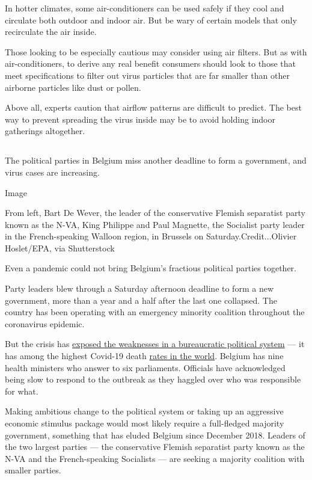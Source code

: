 In hotter climates, some air-conditioners can be used safely if they
cool and circulate both outdoor and indoor air. But be wary of certain
models that only recirculate the air inside.

Those looking to be especially cautious may consider using air filters.
But as with air-conditioners, to derive any real benefit consumers
should look to those that meet specifications to filter out virus
particles that are far smaller than other airborne particles like dust
or pollen.

Above all, experts caution that airflow patterns are difficult to
predict. The best way to prevent spreading the virus inside may be to
avoid holding indoor gatherings altogether.

\hypertarget{section-10}{%
\subsection{}\label{section-10}}

The political parties in Belgium miss another deadline to form a
government, and virus cases are increasing.

Image

From left, Bart De Wever, the leader of the conservative Flemish
separatist party known as the N-VA, King Philippe and Paul Magnette, the
Socialist party leader in the French-speaking Walloon region, in
Brussels on Saturday.Credit...Olivier Hoslet/EPA, via Shutterstock

Even a pandemic could not bring Belgium's fractious political parties
together.

Party leaders blew through a Saturday afternoon deadline to form a new
government, more than a year and a half after the last one collapsed.
The country has been operating with an emergency minority coalition
throughout the coronavirus epidemic.

But the crisis has
\href{https://www.nytimes.com/2020/08/08/world/europe/coronavirus-nursing-homes-elderly.html}{exposed
the weaknesses in a bureaucratic political system} --- it has among the
highest Covid-19 death
\href{https://www.nytimes.com/interactive/2020/world/coronavirus-maps.html}{rates
in the world}. Belgium has nine health ministers who answer to six
parliaments. Officials have acknowledged being slow to respond to the
outbreak as they haggled over who was responsible for what.

Making ambitious change to the political system or taking up an
aggressive economic stimulus package would most likely require a
full-fledged majority government, something that has eluded Belgium
since December 2018. Leaders of the two largest parties --- the
conservative Flemish separatist party known as the N-VA and the
French-speaking Socialists --- are seeking a majority coalition with
smaller parties.

